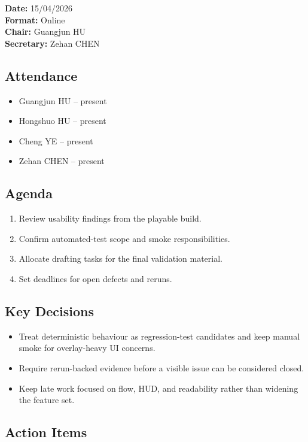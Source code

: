 \textbf{Date:} 15/04/2026 \\
\textbf{Format:} Online \\
\textbf{Chair:} Guangjun HU \\
\textbf{Secretary:} Zehan CHEN

\subsection{Attendance}

\begin{itemize}
    \item Guangjun HU -- present
    \item Hongshuo HU -- present
    \item Cheng YE -- present
    \item Zehan CHEN -- present
\end{itemize}

\subsection{Agenda}

\begin{enumerate}
    \item Review usability findings from the playable build.
    \item Confirm automated-test scope and smoke responsibilities.
    \item Allocate drafting tasks for the final validation material.
    \item Set deadlines for open defects and reruns.
\end{enumerate}

\subsection{Key Decisions}

\begin{itemize}
    \item Treat deterministic behaviour as regression-test candidates and keep manual smoke for overlay-heavy UI concerns.
    \item Require rerun-backed evidence before a visible issue can be considered closed.
    \item Keep late work focused on flow, HUD, and readability rather than widening the feature set.
\end{itemize}

\subsection{Action Items}

